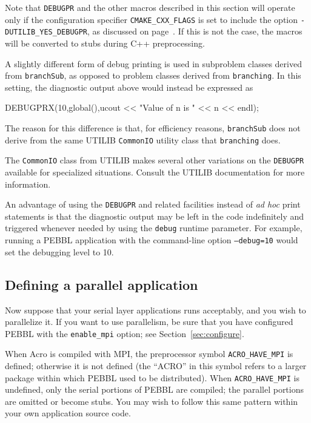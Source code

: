 Note that \texttt{DEBUGPR} and the other macros described in this section will
operate only if the configuration specifier \texttt{CMAKE\_CXX\_FLAGS} is set to
include the option \texttt{-DUTILIB\_YES\_DEBUGPR}, as discussed on
page~\pageref{advancedoptions}.  If this is not the case, the macros will be
converted to stubs during C++ preprocessing.

A slightly different form of debug printing is used in subproblem
classes derived from \texttt{branchSub}, as opposed to problem classes
derived from \texttt{branching}.  In this setting, the diagnostic
output above would instead be expressed as
\begin{codeblock}
DEBUGPRX(10,global(),ucout << "Value of n is " << n << endl);
\end{codeblock}
The reason for this difference is that, for efficiency reasons,
\texttt{branchSub} does not derive from the same UTILIB
\texttt{CommonIO} utility class that \texttt{branching} does.  

The \texttt{CommonIO} class from UTILIB makes several other variations
on the \texttt{DEBUGPR} available for specialized situations.  Consult
the UTILIB documentation for more information.

An advantage of using the \texttt{DEBUGPR} and related facilities
instead of \emph{ad hoc} print statements is that the diagnostic
output may be left in the code indefinitely and triggered whenever
needed by using the \texttt{debug} runtime parameter.  For example,
running a PEBBL application with the command-line option
\texttt{--debug=10} would set the debugging level to 10.  

\subsection{Defining a parallel application}
\label{sec:parMethods}
Now suppose that your serial layer applications runs acceptably, and you wish
to parallelize it.  If you want to use parallelism, be sure that you have
configured PEBBL with the \texttt{enable\_mpi} option; see
Section~\ref{sec:configure}.

When Acro is compiled with MPI, the preprocessor symbol
\texttt{ACRO\_HAVE\_MPI} is defined; otherwise it is not defined (the ``ACRO''
in this symbol refers to a larger package within which PEBBL used to be
distributed). When \texttt{ACRO\_HAVE\_MPI} is undefined, only the serial
portions of PEBBL are compiled; the parallel portions are omitted or become
stubs.  You may wish to follow this same pattern within your own application
source code.

